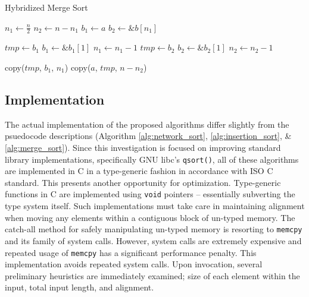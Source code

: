 \documentclass[12pt, conference]{ieeeconf}
\begin{document}
\begin{algorithm}[H]
	\caption{Hybridized Merge Sort}
	\label{alg:merge_sort}
	\begin{algorithmic}
		\State \Return
		\EndIf

		\State {}
		\State \Return
		\State {}
		\State \Return
		\State {}
		\State \Return
		\EndIf

		\State {}
		\State \Return
		\EndIf

		\State $n_{1} \gets \frac{n}{2}$
		\State $n_{2} \gets n - n_{1}$
		\State $b_{1} \gets a$
		\State $b_{2} \gets \&b[n_{1}]$

		\State {}
		\State {}

		\State $tmp \gets b_{1}$
		\State $b_{1} \gets \&b_{1}[1]$
		\State $n_{1} \gets n_{1} - 1$
		\Else
		\State $tmp \gets b_{2}$
		\State $b_{2} \gets \&b_{2}[1]$
		\State $n_{2} \gets n_{2} - 1$
		\EndIf
		\EndWhile

		\State copy($tmp$, $b_{1}$, $n_{1}$)
		\EndIf
		\State copy($a$, $tmp$, $n - n_{2}$)
		\EndProcedure
	\end{algorithmic}
\end{algorithm}

\subsection{Implementation}

The actual implementation of the proposed algorithms differ slightly from the
psuedocode descriptions (Algorithm \ref{alg:network_sort},
\ref{alg:insertion_sort}, \& \ref{alg:merge_sort}). Since this investigation is
focused on improving standard library implementations, specifically GNU libc's
\verb|qsort()|, all of these algorithms are implemented in C in a type-generic
fashion in accordance with ISO C standard\parencite{iso_c}. This presents
another opportunity for optimization. Type-generic functions in C are
implemented using \verb|void| pointers -- essentially subverting the type system
itself. Such implementations must take care in maintaining alignment when moving
any elements within a contiguous block of un-typed memory. The catch-all method
for safely manipulating un-typed memory is resorting to \verb|memcpy| and its
family of system calls. However, system calls are extremely expensive and
repeated usage of \verb|memcpy| has a significant performance penalty. This
implementation avoids repeated system calls. Upon invocation, several
preliminary heuristics are immediately examined; size of each element within the
input, total input length, and alignment.
\end{document}
